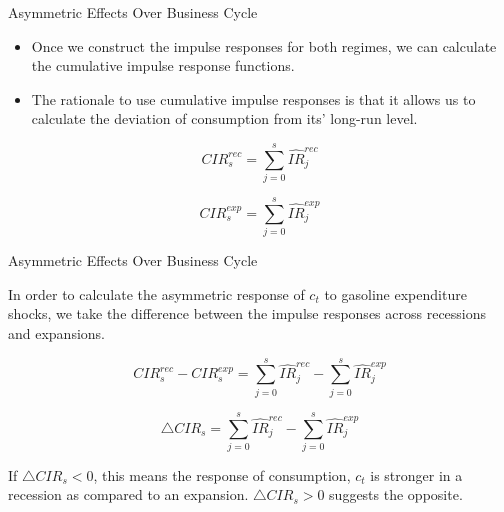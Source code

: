 \documentclass[
  10pt,
  ignorenonframetext,
]{beamer}
\begin{document}
\begin{frame}{Asymmetric Effects Over Business Cycle}
\protect\hypertarget{asymmetric-effects-over-business-cycle-7}{}

\begin{itemize}
\item
  Once we construct the impulse responses for both regimes, we can
  calculate the cumulative impulse response functions.
\item
  The rationale to use cumulative impulse responses is that it allows us
  to calculate the deviation of consumption from its' long-run level.
\end{itemize}

\[CIR_{s}^{rec}=\sum_{j=0}^{s}\widehat{IR}_{j}^{rec}\]

\[CIR_{s}^{exp}=\sum_{j=0}^{s}\widehat{IR}_{j}^{exp}\]

\end{frame}

\begin{frame}{Asymmetric Effects Over Business Cycle}
\protect\hypertarget{asymmetric-effects-over-business-cycle-8}{}

In order to calculate the asymmetric response of \(c_{t}\) to gasoline
expenditure shocks, we take the difference between the impulse responses
across recessions and expansions.

\[CIR_{s}^{rec}-CIR_{s}^{exp}=\sum_{j=0}^{s}\widehat{IR}_{j}^{rec}-\sum_{j=0}^{s}\widehat{IR}_{j}^{exp}\]

\[\triangle CIR_{s}=\sum_{j=0}^{s}\widehat{IR}_{j}^{rec}-\sum_{j=0}^{s}\widehat{IR}_{j}^{exp}\]

If \(\triangle CIR_{s}<0\), this means the response of consumption,
\(c_{t}\) is stronger in a recession as compared to an expansion.
\(\triangle CIR_{s}>0\) suggests the opposite.

\end{frame}
\end{document}
